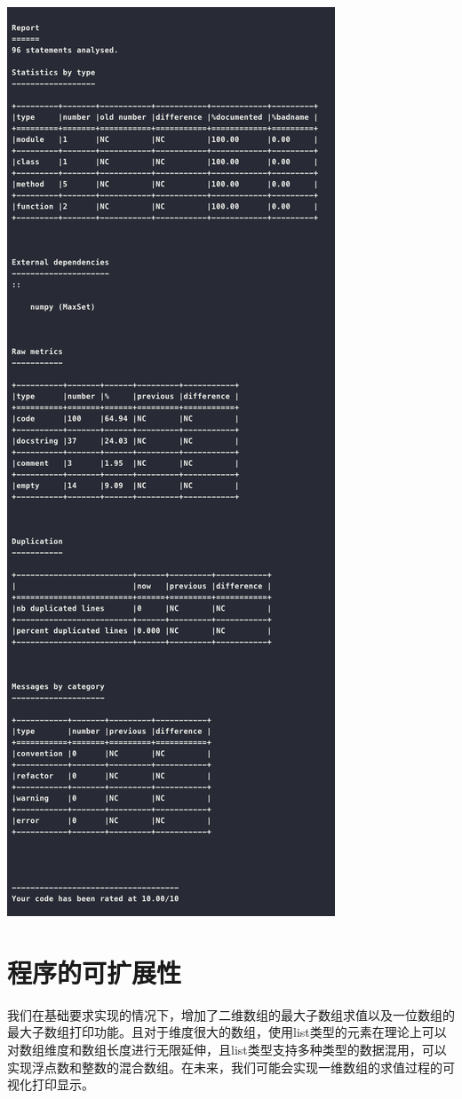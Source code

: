 \documentclass{article}
\begin{document}
\begin{center}
   \includegraphics[scale = 0.5]{11.png}
\end{center}
\section{程序的可扩展性}
我们在基础要求实现的情况下，增加了二维数组的最大子数组求值以及一位数组的最大子数组打印功能。且对于维度很大的数组，使用list类型的元素在理论上可以对数组维度和数组长度进行无限延伸，且list类型支持多种类型的数据混用，可以实现浮点数和整数的混合数组。在未来，我们可能会实现一维数组的求值过程的可视化打印显示。
\end{document}
